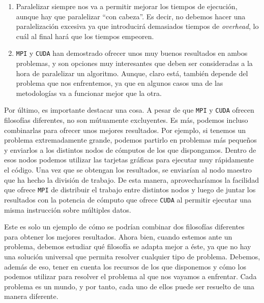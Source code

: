 \documentclass[11pt,a4paper]{article}
\begin{document}
\begin{enumerate}
	\item Paralelizar siempre nos va a permitir mejorar los tiempos de ejecución, aunque
	hay que paralelizar ``con cabeza''. Es decir, no debemos hacer una paralelización excesiva
	ya que introducirá demasiados tiempos de \textit{overhead}, lo cuál al final hará que
	los tiempos empeoren.
	\item \texttt{MPI} y \texttt{CUDA} han demostrado ofrecer unos muy buenos resultados
	en ambos problemas, y son opciones muy interesantes que deben ser consideradas a la hora
	de paralelizar un algoritmo. Aunque, claro está, también depende del problema que nos
	enfrentemos, ya que en algunos casos una de las metodologías va a funcionar mejor que
	la otra.
\end{enumerate}

Por último, es importante destacar una cosa. A pesar de que \texttt{MPI} y \texttt{CUDA} ofrecen
filosofías diferentes, no son mútuamente excluyentes. Es más, podemos incluso combinarlas
para ofrecer unos mejores resultados. Por ejemplo, si tenemos un problema extremadamente
grande, podemos partirlo en problemas más pequeños y enviarlos a los distintos nodos de cómputos
de los que dispongamos. Dentro de esos nodos podemos utilizar las tarjetas gráficas para ejecutar
muy rápidamente el código. Una vez que se obtengan los resultados, se enviarían al nodo maestro
que ha hecho la división de trabajo. De esta manera, aprovecharíamos la facilidad que ofrece
\texttt{MPI} de distribuir el trabajo entre distintos nodos y luego de juntar los resultados con
la potencia de cómputo que ofrece \texttt{CUDA} al permitir ejecutar una misma instrucción
sobre múltiples datos.

Este es solo un ejemplo de cómo se podrían combinar dos filosofías diferentes para obtener
los mejores resultados. Ahora bien, cuando estemos ante un problema, debemos estudiar
qué filosofía se adapta mejor a éste, ya que no hay una solución universal que permita
resolver cualquier tipo de problema. Debemos, además de eso, tener en cuenta los recursos
de los que disponemos y cómo los podemos utilizar para resolver el problema al que
nos vayamos a enfrentar. Cada problema es un mundo, y por tanto, cada uno de ellos
puede ser resuelto de una manera diferente.
\end{document}
